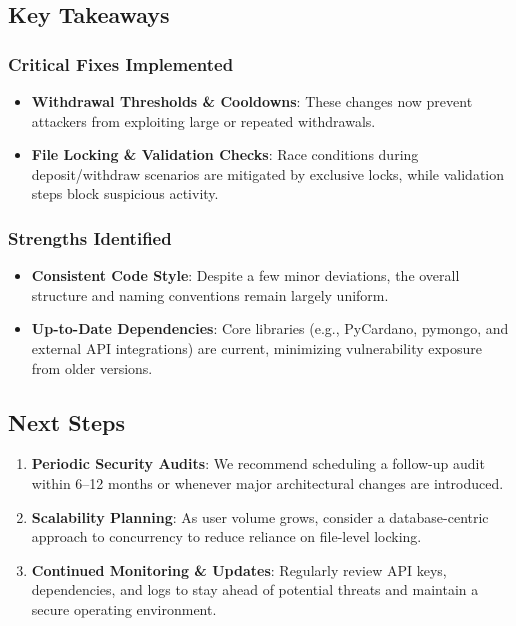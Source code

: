 \documentclass[11pt,a4paper]{article}
\begin{document}
\subsection{Key Takeaways}

\subsubsection{Critical Fixes Implemented}
\begin{itemize}
    \item \textbf{Withdrawal Thresholds \& Cooldowns}: These changes now prevent attackers from exploiting large or repeated withdrawals.
    \item \textbf{File Locking \& Validation Checks}: Race conditions during deposit/withdraw scenarios are mitigated by exclusive locks, while validation steps block suspicious activity.
\end{itemize}

\subsubsection{Strengths Identified}
\begin{itemize}
    \item \textbf{Consistent Code Style}: Despite a few minor deviations, the overall structure and naming conventions remain largely uniform.
    \item \textbf{Up-to-Date Dependencies}: Core libraries (e.g., PyCardano, pymongo, and external API integrations) are current, minimizing vulnerability exposure from older versions.
\end{itemize}

\subsection{Next Steps}
\begin{enumerate}
    \item \textbf{Periodic Security Audits}: We recommend scheduling a follow-up audit within 6–12 months or whenever major architectural changes are introduced.
    \item \textbf{Scalability Planning}: As user volume grows, consider a database-centric approach to concurrency to reduce reliance on file-level locking.
    \item \textbf{Continued Monitoring \& Updates}: Regularly review API keys, dependencies, and logs to stay ahead of potential threats and maintain a secure operating environment.
\end{enumerate}
\end{document}
